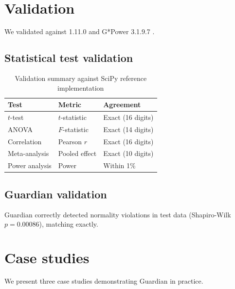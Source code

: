 \documentclass[article]{jss}
\begin{document}
\section{Validation} \label{sec:validation}


We validated  against  1.11.0 and G*Power 3.1.9.7 \citep{faul2007gpower}.

\subsection{Statistical test validation}

\begin{table}[htbp]
\centering
\caption{Validation summary against SciPy reference implementation}
\label{tab:validation}
\begin{tabular}{lll}
\toprule
Test & Metric & Agreement \\
\midrule
$t$-test & $t$-statistic & Exact (16 digits) \\
ANOVA & $F$-statistic & Exact (14 digits) \\
Correlation & Pearson $r$ & Exact (16 digits) \\
Meta-analysis & Pooled effect & Exact (10 digits) \\
Power analysis & Power & Within 1\% \\
\bottomrule
\end{tabular}
\end{table}

\subsection{Guardian validation}

Guardian correctly detected normality violations in test data (Shapiro-Wilk $p = 0.00086$), matching  exactly.


\section{Case studies} \label{sec:cases}


We present three case studies demonstrating Guardian in practice.
\end{document}
